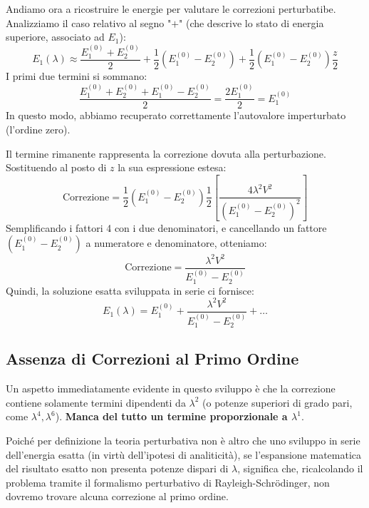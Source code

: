 Andiamo ora a ricostruire le energie per valutare le correzioni perturbatibe. Analizziamo il caso relativo al segno "$+$" (che descrive lo stato di energia superiore, associato ad $E_1$):
\begin{equation}
E_1(\lambda) \approx \frac{E_1^{(0)} + E_2^{(0)}}{2} + \frac{1}{2} (E_1^{(0)} - E_2^{(0)}) + \frac{1}{2} (E_1^{(0)} - E_2^{(0)}) \frac{z}{2}
\end{equation}
I primi due termini si sommano:
\begin{equation}
\frac{E_1^{(0)} + E_2^{(0)} + E_1^{(0)} - E_2^{(0)}}{2} = \frac{2 E_1^{(0)}}{2} = E_1^{(0)}
\end{equation}
In questo modo, abbiamo recuperato correttamente l'autovalore imperturbato (l'ordine zero).

Il termine rimanente rappresenta la correzione dovuta alla perturbazione. Sostituendo al posto di $z$ la sua espressione estesa:
\begin{equation}
\text{Correzione} = \frac{1}{2} (E_1^{(0)} - E_2^{(0)}) \frac{1}{2} \left[ \frac{4\lambda^2 V^2}{(E_1^{(0)} - E_2^{(0)})^2} \right]
\end{equation}
Semplificando i fattori 4 con i due denominatori, e cancellando un fattore $(E_1^{(0)} - E_2^{(0)})$ a numeratore e denominatore, otteniamo:
\begin{equation}
\text{Correzione} = \frac{\lambda^2 V^2}{E_1^{(0)} - E_2^{(0)}}
\end{equation}
Quindi, la soluzione esatta sviluppata in serie ci fornisce:
\begin{equation}
E_1(\lambda) = E_1^{(0)} + \frac{\lambda^2 V^2}{E_1^{(0)} - E_2^{(0)}} + \dots
\end{equation}

\subsection{Assenza di Correzioni al Primo Ordine}
Un aspetto immediatamente evidente in questo sviluppo è che la correzione contiene solamente termini dipendenti da $\lambda^2$ (o potenze superiori di grado pari, come $\lambda^4, \lambda^6$). \textbf{Manca del tutto un termine proporzionale a $\lambda^1$}.

Poiché per definizione la teoria perturbativa non è altro che uno sviluppo in serie dell'energia esatta (in virtù dell'ipotesi di analiticità), se l'espansione matematica del risultato esatto non presenta potenze dispari di $\lambda$, significa che, ricalcolando il problema tramite il formalismo perturbativo di Rayleigh-Schrödinger, non dovremo trovare alcuna correzione al primo ordine.

